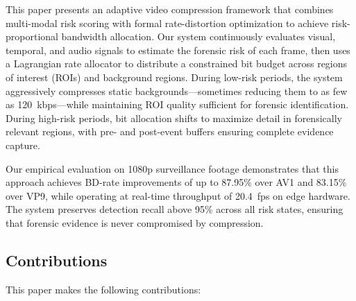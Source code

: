 This paper presents an adaptive video compression framework that combines multi-modal risk scoring with formal rate-distortion optimization to achieve risk-proportional bandwidth allocation. Our system continuously evaluates visual, temporal, and audio signals to estimate the forensic risk of each frame, then uses a Lagrangian rate allocator to distribute a constrained bit budget across regions of interest (ROIs) and background regions. During low-risk periods, the system aggressively compresses static backgrounds---sometimes reducing them to as few as 120~kbps---while maintaining ROI quality sufficient for forensic identification. During high-risk periods, bit allocation shifts to maximize detail in forensically relevant regions, with pre- and post-event buffers ensuring complete evidence capture.

Our empirical evaluation on 1080p surveillance footage demonstrates that this approach achieves BD-rate improvements of up to 87.95\% over AV1 and 83.15\% over VP9, while operating at real-time throughput of 20.4~fps on edge hardware. The system preserves detection recall above 95\% across all risk states, ensuring that forensic evidence is never compromised by compression.

\subsection{Contributions}

This paper makes the following contributions:

